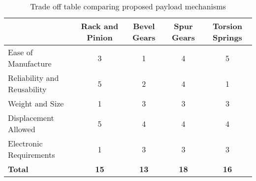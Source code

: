 \begin{table}[]
\centering
\begin{tabular}{@{}lcccc@{}}
\toprule
                            & \textbf{Rack and Pinion} & \textbf{Bevel Gears} & \textbf{Spur Gears} & \textbf{Torsion Springs} \\ \midrule
Ease of Manufacture         & 3                               & 1                             & 4                          & 5                        \\
Reliability and Reusability & 5                               & 2                             & 4                          & 1                        \\
Weight and Size             & 1                               & 3                             & 3                          & 3                        \\
Displacement Allowed        & 5                               & 4                             & 4                          & 4                        \\
Electronic Requirements     & 1                               & 3                             & 3                          & 3                        \\
\textbf{Total}              & \textbf{15}                     & \textbf{13}                   & \textbf{18}                & \textbf{16}              \\ \bottomrule
\end{tabular}
\caption{Trade off table comparing proposed payload mechanisms}
\label{table:trade}
\end{table} 


